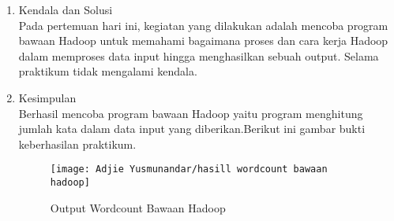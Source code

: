 \begin{enumerate}
\item Kendala dan Solusi \\
Pada pertemuan hari ini, kegiatan yang dilakukan adalah mencoba program bawaan Hadoop untuk memahami bagaimana
proses dan cara kerja Hadoop dalam memproses data input hingga menghasilkan sebuah output. Selama praktikum tidak mengalami kendala.

\item Kesimpulan\\
Berhasil mencoba program bawaan Hadoop yaitu program menghitung jumlah kata dalam data input yang diberikan.Berikut ini gambar bukti keberhasilan praktikum. 
\begin{figure}[!ht]
\texttt{[image: Adjie Yusmunandar/hasill wordcount bawaan hadoop]}
\caption{Output Wordcount Bawaan Hadoop}
\label{gam:WordCount bawaan-Hadoop}
\end{figure}
\end{enumerate}